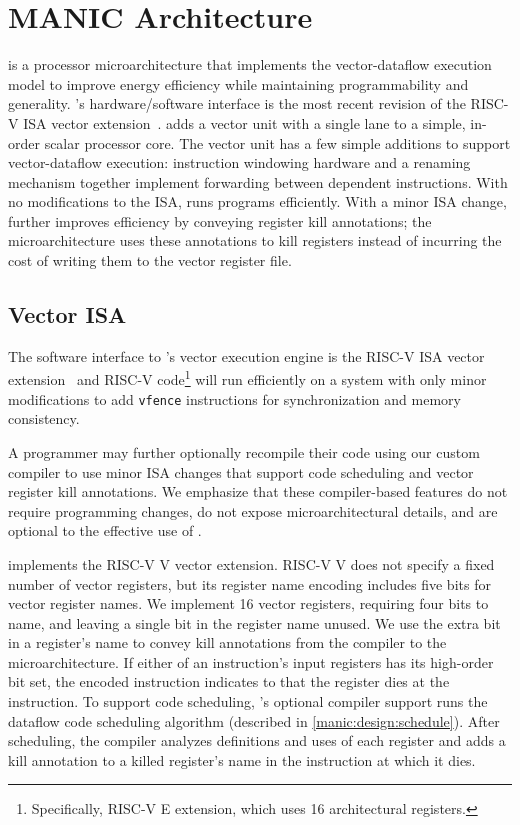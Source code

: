 \section{MANIC Architecture}
\label{manic:manic}
\manic is a processor microarchitecture that implements the
vector-dataflow execution model to improve energy efficiency while
maintaining programmability and generality.
%
\manic's hardware/software interface is the most recent revision of the RISC-V
ISA vector extension~\cite{riscv_2019}.
%
\manic adds a vector unit with a single lane to a simple, in-order scalar processor core.
%
The vector unit has a few simple additions to support vector-dataflow execution: instruction windowing hardware and a renaming mechanism together implement
forwarding between dependent instructions.
%
With no modifications to the ISA, \manic runs programs efficiently.  With a
minor ISA change, \manic further improves efficiency by conveying register kill
annotations; the microarchitecture uses these annotations to
kill registers instead of incurring the cost of writing them to the vector
register file. 

\subsection{Vector ISA}
\label{manic:manic:isa}
The software interface to \manic's vector execution engine is the RISC-V ISA
vector extension~\cite{riscv_2019} and RISC-V code\footnote{Specifically, RISC-V E extension, which uses 16 architectural registers.} will run efficiently on a \manic
system with only minor modifications to add {\tt vfence} instructions for synchronization and  memory consistency. 

A programmer may further optionally recompile their code using our custom \manic
compiler to use minor ISA changes that support code scheduling and vector
register kill annotations.  We emphasize that these compiler-based features do
not require programming changes, do not expose microarchitectural details, and
are optional to the effective use of \manic.%

\manic implements the RISC-V V vector extension. RISC-V V does not specify a
fixed number of vector registers, but its register name encoding includes five
bits for vector register names.  We implement 16 vector registers, requiring
four bits to name, and leaving a single bit in the register name unused.
We use the extra bit in a register's name to convey kill annotations from the
compiler to the microarchitecture.  If either of an instruction's input
registers has its high-order bit set, the encoded instruction indicates to
\manic that the register dies at the instruction.
%
To support code scheduling, \manic's optional compiler support runs the
dataflow code scheduling algorithm (described in \autoref{manic:design:schedule}).
%
After scheduling, the compiler analyzes definitions and uses of each register
and adds a kill annotation to a killed register's name in the instruction 
at which it dies. 

